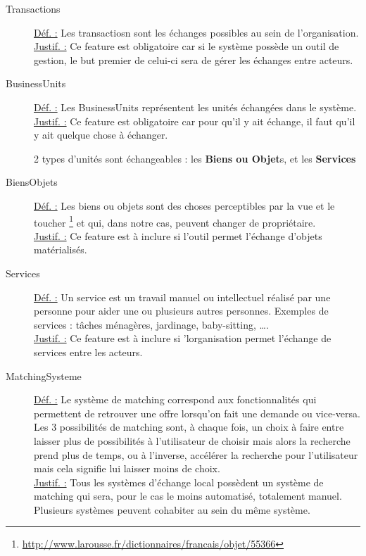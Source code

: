 \begin{description}
\begin{center}
\end{center}

\item [Transactions]
\underline{Déf. :}  Les transactiosn sont les échanges possibles au sein de l'organisation.
\\ \underline{Justif. :}  Ce feature est obligatoire car si le système possède un outil de gestion,  le but premier de celui-ci sera de gérer les échanges entre acteurs.
\newline

\item [BusinessUnits]
\underline{Déf. :}  Les BusinessUnits représentent les unités échangées dans le système.
\\ \underline{Justif. :}  Ce feature est obligatoire car pour qu'il y ait échange,  il faut qu'il y ait quelque chose à échanger.
\newline

2 types d'unités sont échangeables : les \textbf{Biens ou Objet}s,  et les \textbf{Services}

\item [BiensObjets]
\underline{Déf. :}  Les biens ou objets sont des choses perceptibles par la vue et le toucher \footnote{\href{http://www.larousse.fr/dictionnaires/francais/objet/55366}{http://www.larousse.fr/dictionnaires/francais/objet/55366}}  et qui,  dans notre cas,  peuvent changer de propriétaire.
\\ \underline{Justif. :}  Ce feature est à inclure si l'outil permet l'échange d'objets matérialisés. 
\newline

\item [Services]
\underline{Déf. :}  Un service est un travail manuel ou intellectuel réalisé par une personne pour aider une ou plusieurs autres personnes.  Exemples de services : tâches ménagères,  jardinage,  baby-sitting,  \dots .
\\ \underline{Justif. :} Ce feature est à inclure si 'lorganisation permet l'échange de services entre les acteurs. 
\newline

\item [MatchingSysteme]
\underline{Déf. :}  Le système de matching correspond aux fonctionnalités qui permettent de retrouver une offre lorsqu'on fait une demande ou vice-versa.  Les 3 possibilités de matching sont,  à chaque fois,  un choix à faire entre laisser plus de possibilités à l'utilisateur de choisir mais alors la recherche prend plus de temps,  ou à l'inverse,  accélérer la recherche pour l'utilisateur mais cela signifie lui laisser moins de choix.
\\ \underline{Justif. :}  Tous les systèmes d'échange local possèdent un système de matching qui sera,  pour le cas le moins automatisé,  totalement manuel.  Plusieurs systèmes peuvent cohabiter au sein du même système.
\newline


\end{description}
